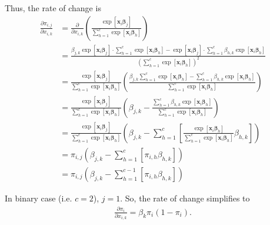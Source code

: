 \documentclass[a4paper]{article}
\begin{document}
Thus, the rate of change is
\begin{align*}
\frac{\partial \pi_{i,j}}{\partial x_{i,k}} &= \frac{\partial}{\partial x_{i,k}}\left(\frac{\exp\left[\bm{x}_{i}\bm{\beta}_{j}\right]}{\sum_{h=1}^{c}\exp\left[\bm{x}_{i}\bm{\beta}_{h}\right]}\right)\\
&= \frac{\beta_{j,k}\exp\left[\bm{x}_{i}\bm{\beta}_{j}\right] \cdot \sum_{h=1}^{c}\exp\left[\bm{x}_{i}\bm{\beta}_{h}\right] - \exp\left[\bm{x}_{i}\bm{\beta}_{j}\right] \cdot \sum_{h=1}^{c}\beta_{h,k}\exp\left[\bm{x}_{i}\bm{\beta}_{h}\right]}{\left(\sum_{h=1}^{c}\exp\left[\bm{x}_{i}\bm{\beta}_{h}\right]\right)^2}\\
&= \frac{\exp\left[\bm{x}_{i}\bm{\beta}_{j}\right]}{\sum_{h=1}^{c}\exp\left[\bm{x}_{i}\bm{\beta}_{h}\right]}\left(\frac{\beta_{j,k}\sum_{h=1}^{c}\exp\left[\bm{x}_{i}\bm{\beta}_{h}\right] - \sum_{h=1}^{c}\beta_{h,k}\exp\left[\bm{x}_{i}\bm{\beta}_{h}\right]}{\sum_{h=1}^{c}\exp\left[\bm{x}_{i}\bm{\beta}_{h}\right]}\right)\\
&= \frac{\exp\left[\bm{x}_{i}\bm{\beta}_{j}\right]}{\sum_{h=1}^{c}\exp\left[\bm{x}_{i}\bm{\beta}_{h}\right]}\left(\beta_{j,k} -\frac{\sum_{h=1}^{c}\beta_{h,k}\exp\left[\bm{x}_{i}\bm{\beta}_{h}\right]}{\sum_{h=1}^{c}\exp\left[\bm{x}_{i}\bm{\beta}_{h}\right]}\right)\\
&= \frac{\exp\left[\bm{x}_{i}\bm{\beta}_{j}\right]}{\sum_{h=1}^{c}\exp\left[\bm{x}_{i}\bm{\beta}_{h}\right]}\left(\beta_{j,k} -\sum_{h=1}^{c}\left[\frac{\exp\left[\bm{x}_{i}\bm{\beta}_{h}\right]}{\sum_{h=1}^{c}\exp\left[\bm{x}_{i}\bm{\beta}_{h}\right]}\beta_{h,k}\right]\right)\\
&= \pi_{i,j}\left(\beta_{j,k} -\sum_{h=1}^{c}\left[\pi_{i,h}\beta_{h,k}\right]\right)\\
&= \pi_{i,j}\left(\beta_{j,k} -\sum_{h=1}^{c-1}\left[\pi_{i,h}\beta_{h,k}\right]\right)
\end{align*}

In binary case (i.e. $c = 2$), $j = 1$. So, the rate of change simplifies to 
\begin{align*}
\frac{\partial \pi_{i}}{\partial x_{i,k}} = \beta_{k}\pi_{i}(1-\pi_{i}).
\end{align*}


\vspace{\baselineskip}
\end{document}
